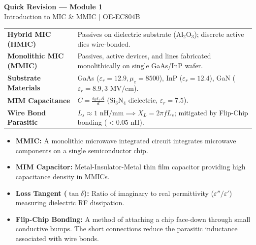 \documentclass[12pt,a4paper]{article}
\renewcommand{\arraystretch}{1.45}
\begin{document}
\newpage
\begin{center}
  {\large\bfseries\color{myred} Quick Revision --- Module 1}\\[3pt]
  {\small\color{mydark} Introduction to MIC \& MMIC $|$ OE-EC804B}
\end{center}
\noindent{\color{myred}\rule{\linewidth}{1.2pt}}
\vspace{4pt}

\begin{tcolorbox}[formulabox, title={\textbf{Key Concepts and Metrics at a Glance}}]
\renewcommand{\arraystretch}{1.35}
\begin{tabularx}{\linewidth}{>{\raggedright\arraybackslash\bfseries}p{4.5cm} X}
Hybrid MIC (HMIC) & Passives on dielectric substrate ($\text{Al}_2\text{O}_3$); discrete active dies wire-bonded. \\[4pt]
Monolithic MIC (MMIC) & Passives, active devices, and lines fabricated monolithically on single GaAs/InP wafer. \\[4pt]
Substrate Materials & GaAs ($\varepsilon_r=12.9, \mu_e=8500$), InP ($\varepsilon_r=12.4$), GaN ($\varepsilon_r=8.9, 3\text{ MV/cm}$). \\[4pt]
MIM Capacitance & $C = \frac{\varepsilon_0 \varepsilon_r A}{d}$ \quad ($\text{Si}_3\text{N}_4$ dielectric, $\varepsilon_r = 7.5$). \\[4pt]
Wire Bond Parasitic & $L_s \approx 1\text{ nH/mm} \implies X_L = 2\pi f L_s$; mitigated by Flip-Chip bonding ($<0.05\text{ nH}$). \\
\end{tabularx}
\end{tcolorbox}

\begin{tcolorbox}[defbox, title={\textbf{One-Line Definitions}}]
  \begin{itemize}[leftmargin=*, noitemsep]
    \item \textbf{MMIC:} A monolithic microwave integrated circuit integrates microwave components on a single semiconductor chip.
    \item \textbf{MIM Capacitor:} Metal-Insulator-Metal thin film capacitor providing high capacitance density in MMICs.
    \item \textbf{Loss Tangent ($\tan\delta$):} Ratio of imaginary to real permittivity ($\varepsilon''/\varepsilon'$) measuring dielectric RF dissipation.
    \item \textbf{Flip-Chip Bonding:} A method of attaching a chip face-down through small conductive bumps. The short connections reduce the parasitic inductance associated with wire bonds.
  \end{itemize}
\end{tcolorbox}
\end{document}
